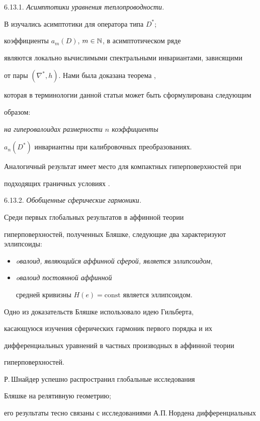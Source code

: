 6.13.1. {\it Асимптотики уравнения теплопроводности.}

В \cite{BOK-G-S-1} изучались асимптотики для оператора типа $D^*$;

коэффициенты $a_m(D)$, $m \in \Bbb{N}$, в асимптотическом ряде

являются локально вычислимыми спектральными инвариантами, зависящими

от пары $(\nabla^*,h)$. Нами была доказана теорема \cite{BOK-G-S-1}, 

которая в терминологии данной статьи может быть сформулирована следующим 

образом: {\it на гиперовалоидах размерности $n$ коэффициенты

$a_n(D^*)$ инвариантны при калибровочных преобразованиях.}

Аналогичный результат имеет место для компактных гиперповерхностей при

подходящих граничных условиях \cite{BOK-G-S-1}.

\smallskip



6.13.2. {\it Обобщенные сферические гармоники.}

Среди первых глобальных результатов в аффинной теории

гиперповерхностей, полученных Бляшке, следующие два характеризуют эллипсоиды:

\begin{itemize}

\item[(i)] {\it oвалоид, являющийся аффинной сферой, является эллипсоидом},

\item[(ii)] {\it oвалоид постоянной аффинной

средней кривизны $H(e)=\mathrm{const}$ является эллипсоидом.}

\end{itemize}

Одно из доказательств Бляшке \cite{BLA} использовало идею Гильберта,

касающуюся изучения сферических гармоник первого порядка и их

дифференциальных уравнений в частных производных в аффинной теории

гиперповерхностей.

Р.\,Шнайдер \cite{SCHN} успешно распространил глобальные исследования

Бляшке на релятивную геометрию;

его результаты тесно связаны с исследованиями А.П.\,Нордена дифференциальных


